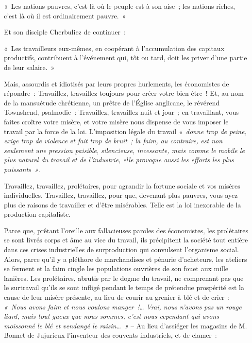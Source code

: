 \documentclass[french,twoside]{book} %
\newenvironment{quoteblock}%
  {\begin{quoting}}
  {\end{quoting}}
\newenvironment{quotebar}{%
    \def\FrameCommand{{\color{rubric!10!}\vrule width 0.5em} \hspace{0.9em}}%
    \def\OuterFrameSep{\itemsep} %
    \MakeFramed {\advance\hsize-\width \FrameRestore}
  }%
  {%
    \endMakeFramed
  }
\renewenvironment{quoteblock}%
  {%
    \savenotes
    \setstretch{0.9}
    \normalfont
    \begin{quotebar}
  }
  {%
    \end{quotebar}
    \spewnotes
  }
\begin{document}
\begin{quoteblock}
 \noindent « Les nations pauvres, c’est là où le peuple est à son aise ; les nations riches, c’est là où il est ordinairement pauvre. »
\end{quoteblock}

\noindent Et son disciple Cherbuliez de continuer :\par

\begin{quoteblock}
 \noindent « Les travailleurs eux-mêmes, en coopérant à l’accumulation des capitaux productifs, contribuent à l’événement qui, tôt ou tard, doit les priver d’une partie de leur salaire. »
\end{quoteblock}

\noindent Mais, assourdis et idiotisés par leurs propres hurlements, les économistes de répondre : Travaillez, travaillez toujours pour créer votre bien-être ! Et, au nom de la mansuétude chrétienne, un prêtre de l’Église anglicane, le révérend Townshend, psalmodie : Travaillez, travaillez nuit et jour ; en travaillant, vous faites croître votre misère, et votre misère nous dispense de vous imposer le travail par la force de la loi. L’imposition légale du travail \emph{« donne trop de peine, exige trop de violence et fait trop de bruit ; la faim, au contraire, est non seulement une pression paisible, silencieuse, incessante, mais comme le mobile le plus naturel du travail et de l’industrie, elle provoque aussi les efforts les plus puissants »}.\par
Travaillez, travaillez, prolétaires, pour agrandir la fortune sociale et vos misères individuelles. Travaillez, travaillez, pour que, devenant plus pauvres, vous ayez plus de raisons de travailler et d’être misérables. Telle est la loi inexorable de la production capitaliste.\par
Parce que, prêtant l’oreille aux fallacieuses paroles des économistes, les prolétaires se sont livrés corps et âme au vice du travail, ils précipitent la société tout entière dans ces crises industrielles de surproduction qui convulsent l’organisme social. Alors, parce qu’il y a pléthore de marchandises et pénurie d’acheteurs, les ateliers se ferment et la faim cingle les populations ouvrières de son fouet aux mille lanières. Les prolétaires, abrutis par le dogme du travail, ne comprenant pas que le surtravail qu’ils se sont infligé pendant le temps de prétendue prospérité est la cause de leur misère présente, au lieu de courir au grenier à blé et de crier : \emph{« Nous avons faim et nous voulons manger !… Vrai, nous n’avons pas un rouge liard, mais tout gueux que nous sommes, c’est nous cependant qui avons moissonné le blé et vendangé le raisin… »} – Au lieu d’assiéger les magasins de M. Bonnet de Jujurieux l’inventeur des couvents industriels, et de clamer :\par
\end{document}
